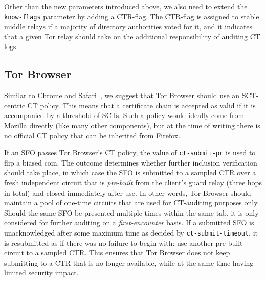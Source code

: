 Other than the new parameters introduced above, we also need to extend the
\texttt{know-flags} parameter by adding a CTR-flag.  The CTR-flag is 
assigned to stable middle relays if a majority of directory authorities voted
for it, and it indicates that a given Tor relay should take on the additional
responsibility of auditing CT logs.


\subsection{Tor Browser}
Similar to Chrome and Safari~\cite{chrome-policy,safari-policy}, we suggest that
Tor Browser should use an SCT-centric CT policy.  This means that a certificate
chain is accepted as valid if it is accompanied by a threshold of SCTs.  Such a
policy would ideally come from Mozilla directly (like many other components),
but at the time of writing there is no official CT policy that can be inherited
from Firefox.

If an SFO passes Tor Browser's CT policy, the value of
\texttt{ct-submit-pr} is used to flip a biased coin.  The outcome determines
whether further inclusion verification should take place, in which case the SFO
is submitted to a sampled CTR over a fresh independent circuit
that is \emph{pre-built} from the client's guard relay (three hops in total) 
and closed immediately after use.  In other words, Tor Browser should maintain a
pool of one-time circuits that are used for CT-auditing purposes only.
Should the same SFO be presented multiple times within the same tab, it is only
considered for further auditing on a \emph{first-encounter} basis.
If a submitted SFO is unacknowledged after some maximum time as decided by
\texttt{ct-submit-timeout}, it is resubmitted as if there was no failure to
begin with:
	use another pre-built circuit to a sampled CTR.
This ensures that Tor Browser does not keep submitting to a CTR that is no
longer available, while at the same time having limited security impact.

